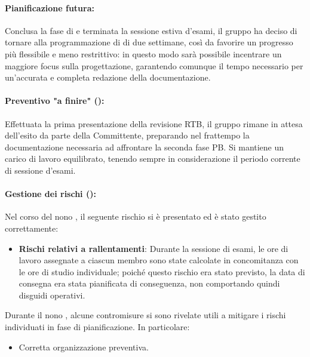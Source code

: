 \paragraph*{Pianificazione futura:}
\par Conclusa la fase di \RTB e terminata la sessione estiva d'esami, il gruppo ha deciso di tornare alla programmazione di  di due settimane, così da favorire un progresso più flessibile e meno restrittivo: in questo modo sarà possibile incentrare un maggiore focus sulla progettazione, garantendo comunque il tempo necessario per un'accurata e completa redazione della documentazione.

\paragraph*{Preventivo "a finire" ():}
\par Effettuata la prima presentazione della revisione RTB, il gruppo rimane in attesa dell'esito da parte della Committente, preparando nel frattempo la documentazione necessaria ad affrontare la seconda fase PB. Si mantiene un carico di lavoro equilibrato, tenendo sempre in considerazione il periodo corrente di sessione d'esami.

\paragraph*{Gestione dei rischi ():}
\par Nel corso del nono , il seguente rischio si è presentato ed è stato gestito correttamente:
\begin{itemize}
  \item \textbf{Rischi relativi a rallentamenti}: Durante la sessione di esami, le ore di lavoro assegnate a ciascun membro sono state calcolate in concomitanza con le ore di studio individuale; poiché questo rischio era stato previsto, la data di consegna era stata pianificata di conseguenza, non comportando quindi disguidi operativi.
\end{itemize}

\vspace{0.5\baselineskip}
\par Durante il nono , alcune contromisure si sono rivelate utili a mitigare i rischi individuati in fase di pianificazione. In particolare:
\begin{itemize}
  \item Corretta organizzazione preventiva.
\end{itemize}
